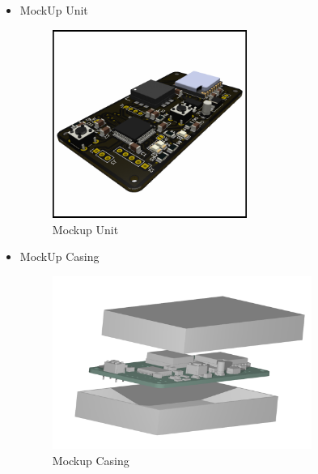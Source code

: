 \documentclass{book} %
\begin{document}
\begin{itemize}
		\newpage
		\item MockUp Unit
		
		\begin{figure}[!ht]
			\centering
			\includegraphics[width=0.6\textwidth]{images/mems_lora.png}
			\caption{Mockup Unit}
		\end{figure}
		
		\item MockUp Casing
		
		\begin{figure}[!ht]
			\centering
			\includegraphics[width=0.8\textwidth]{images/casingpov.png}
			\caption{Mockup Casing}
		\end{figure}
	
	\end{itemize}
\end{document}
